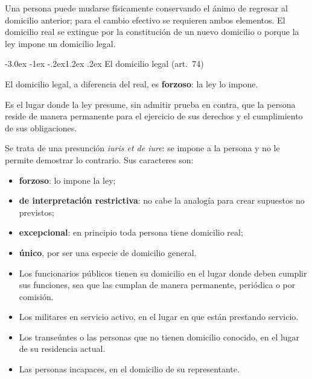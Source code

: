 \documentclass[12pt,oneside]{book}
\makeatletter
\renewcommand\section{\@startsection{section}{1}{\z@}%
  {-3.0ex \@plus -1ex \@minus -.2ex}{1.2ex \@plus .2ex}%
  {\normalfont\large\bfseries\color{acento}}}
\makeatother
\begin{document}
Una persona puede mudarse físicamente conservando el ánimo de regresar al domicilio anterior; para el cambio efectivo se requieren ambos elementos. El domicilio real se extingue por la constitución de un nuevo domicilio o porque la ley impone un domicilio legal.

\section{El domicilio legal (art.~74)}

El domicilio legal, a diferencia del real, es \textbf{forzoso}: la ley lo impone.

\begin{definicion}
Es el lugar donde la ley presume, sin admitir prueba en contra, que la persona reside de manera permanente para el ejercicio de sus derechos y el cumplimiento de sus obligaciones.
\end{definicion}

Se trata de una presunción \textit{iuris et de iure}: se impone a la persona y no le permite demostrar lo contrario. Sus caracteres son:

\begin{itemize}
\item \textbf{forzoso}: lo impone la ley;
\item \textbf{de interpretación restrictiva}: no cabe la analogía para crear supuestos no previstos;
\item \textbf{excepcional}: en principio toda persona tiene domicilio real;
\item \textbf{único}, por ser una especie de domicilio general.
\end{itemize}

\begin{regla}
\begin{itemize}
\item Los funcionarios públicos tienen su domicilio en el lugar donde deben cumplir sus funciones, sea que las cumplan de manera permanente, periódica o por comisión.
\item Los militares en servicio activo, en el lugar en que están prestando servicio.
\item Los transeúntes o las personas que no tienen domicilio conocido, en el lugar de su residencia actual.
\item Las personas incapaces, en el domicilio de su representante.
\end{itemize}
\end{regla}
\end{document}

